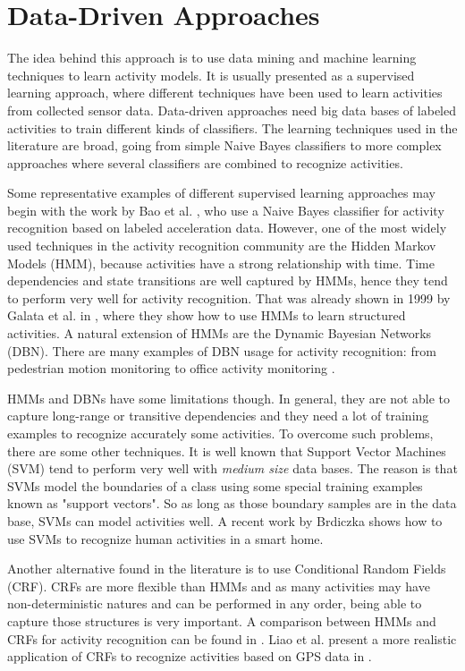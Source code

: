 \section{Data-Driven Approaches}
\label{sec:soa:datadriven}

The idea behind this approach is to use data mining and machine learning techniques to learn activity models. It is usually presented as a supervised learning approach, where different techniques have been used to learn activities from collected sensor data. Data-driven approaches need big data bases of labeled activities to train different kinds of classifiers. The learning techniques used in the literature are broad, going from simple Naive Bayes classifiers to more complex approaches where several classifiers are combined to recognize activities.

Some representative examples of different supervised learning approaches may begin with the work by Bao et al. \cite{Bao2004}, who use a Naive Bayes classifier for activity recognition based on labeled acceleration data. However, one of the most widely used techniques in the activity recognition community are the Hidden Markov Models (HMM), because activities have a strong relationship with time. Time dependencies and state transitions are well captured by HMMs, hence they tend to perform very well for activity recognition. That was already shown in 1999 by Galata et al. in \cite{Galata1999}, where they show how to use HMMs to learn structured activities. A natural extension of HMMs are the Dynamic Bayesian Networks (DBN). There are many examples of DBN usage for activity recognition: from pedestrian motion monitoring \cite{Brand1997} to office activity monitoring \cite{Oliver2004}. 

HMMs and DBNs have some limitations though. In general, they are not able to capture long-range or transitive dependencies and they need a lot of training examples to recognize accurately some activities. To overcome such problems, there are some other techniques. It is well known that Support Vector Machines (SVM) tend to perform very well with \textit{medium size} data bases. The reason is that SVMs model the boundaries of a class using some special training examples known as "support vectors". So as long as those boundary samples are in the data base, SVMs can model activities well. A recent work by Brdiczka \cite{Brdiczka2009} shows how to use SVMs to recognize human activities in a smart home. 

Another alternative found in the literature is to use Conditional Random Fields (CRF). CRFs are more flexible than HMMs and as many activities may have non-deterministic natures and can be performed in any order, being able to capture those structures is very important. A comparison between HMMs and CRFs for activity recognition can be found in \cite{Vail2007}. Liao et al. present a more realistic application of CRFs to recognize activities based on GPS data in \cite{Liao2007}. 

